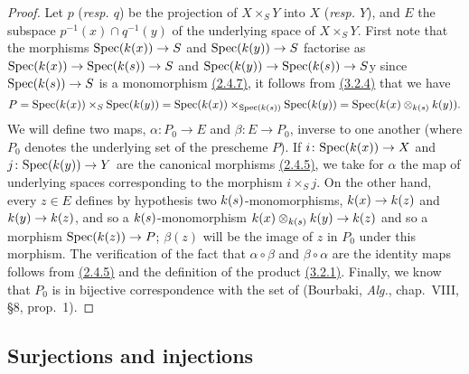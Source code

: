 \begin{proof}
\label{proof-prop-1.3.4.9}
Let $p$ (\emph{resp. $q$}) be the projection of $X\times_S Y$ into $X$ (\emph{resp. $Y$}), and $E$ the subspace $p^{-1}(x)\cap q^{-1}(y)$ of the underlying space of $X\times_S Y$.
First note that the morphisms ${\mathop{\mathrm{Spec}}\nolimits}(k(x))\to S$ and ${\mathop{\mathrm{Spec}}\nolimits}(k(y))\to S$ factorise as ${\mathop{\mathrm{Spec}}\nolimits}(k(x))\to{\mathop{\mathrm{Spec}}\nolimits}(k(s))\to S$ and ${\mathop{\mathrm{Spec}}\nolimits}(k(y))\to{\mathop{\mathrm{Spec}}\nolimits}(k(s))\to S$y since ${\mathop{\mathrm{Spec}}\nolimits}(k(s))\to S$ is a monomorphism \hyperref[cor-1.2.4.7]{(2.4.7)}, it follows from \hyperref[prop-1.3.2.4]{(3.2.4)} that we have
\begin{equation*}
    P = {\mathop{\mathrm{Spec}}\nolimits}(k(x))\times_S{\mathop{\mathrm{Spec}}\nolimits}(k(y)) = {\mathop{\mathrm{Spec}}\nolimits}(k(x))\times_{{\mathop{\mathrm{Spec}}\nolimits}(k(s))}{\mathop{\mathrm{Spec}}\nolimits}(k(y)) = {\mathop{\mathrm{Spec}}\nolimits}(k(x)\otimes_{k(s)}k(y)).
\end{equation*}
We will define two maps, $\alpha\colon P_0\to E$ and $\beta\colon E\to P_0$, inverse to one another (where $P_0$ denotes the underlying set of the prescheme $P$).
If $i\colon{\mathop{\mathrm{Spec}}\nolimits}(k(x))\to X$ and $j\colon{\mathop{\mathrm{Spec}}\nolimits}(k(y))\to Y$ are the canonical morphisms \hyperref[env-1.2.4.5]{(2.4.5)}, we take for $\alpha$ the map of underlying spaces corresponding to the morphism $i\times_S j$.
On the other hand, every $z\in E$ defines by hypothesis two $k(s)$-monomorphisms, $k(x)\to k(z)$ and $k(y)\to k(z)$, and so a $k(s)$-monomorphism $k(x)\otimes_{k(s)}k(y)\to k(z)$ and so a morphism ${\mathop{\mathrm{Spec}}\nolimits}(k(z))\to P$; $\beta(z)$ will be the image of $z$ in $P_0$ under this morphism.
The verification of the fact that $\alpha\circ\beta$ and $\beta\circ\alpha$ are the identity maps follows from \hyperref[env-1.2.4.5]{(2.4.5)} and the definition of the product \hyperref[defn-1.3.2.1]{(3.2.1)}.
Finally, we know that $P_0$ is in bijective correspondence with the set of  (Bourbaki, \emph{Alg.}, chap.~VIII, §8, prop.~1).
\end{proof}

\subsection{Surjections and injections}
\label{subsection-surjections-and-injections}

